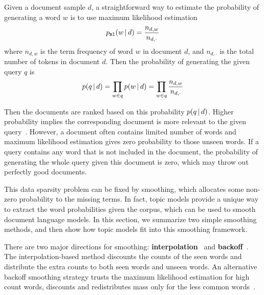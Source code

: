 Given a document sample $d$, a straightforward way to estimate the
probability of generating a word $w$ is to use maximum likelihood
estimation
\begin{align}
p_{\texttt{ml}}(w \, | \, d) = \frac{n_{d,w}}{n_{d,\cdot}}
\label{eq:ir_mse}
\end{align}
where $n_{d,w}$ is the term frequency of word $w$ in document $d$, and
$n_{d,\cdot}$ is the total number of tokens in document $d$. Then the
probability of generating the given query $q$ is
\begin{align}
p(q \, | \, d) = \prod_{w \in q} p(w \, | \, d) = \prod_{w \in q} \frac{n_{d,w}}{n_{d,\cdot}}
\end{align}

Then the documents are ranked based on this probability $p(q \, | \, d)$. Higher
probability implies the corresponding document is more relevant to the
given query~\citep{song-99}. However, a document often contains limited number of words and
maximum likelihood estimation gives zero probability to those unseen words.
If a query contains any word that is not included in the document, the probability
of generating the whole query given this document is zero, which may throw out perfectly good documents.

This data sparsity problem can be fixed by smoothing, which allocates
some non-zero probability to the missing terms. In fact, topic models
provide a unique way to extract the word probabilities given the
corpus, which can be used to smooth document language models.  In
this section, we summarize two simple smoothing methods, and then
show how topic models fit into this smoothing framework.



There are two major directions for smoothing:
\textbf{interpolation}~\citep{Jelinek-1980,mackay95dirichlet,Ney-1994,PonteCroft,zhai-01}
and \textbf{backoff}~\citep{katz-87,song-99}. The interpolation-based
method discounts the counts of the seen words and distribute the extra
counts to both seen words and unseen words. An alternative backoff
smoothing strategy trusts the maximum likelihood estimation for high
count words, discounts and redistributes mass only for the less common
words~\citep{zhai-01}.

